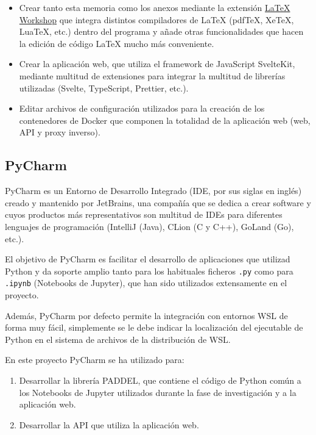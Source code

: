 \begin{itemize}
      \item Crear tanto esta memoria como los anexos mediante la extensión
            \href{https://github.com/James-Yu/LaTeX-Workshop}{\LaTeX{} Workshop}
            que integra distintos compiladores de \LaTeX{} (pdfTeX, XeTeX, LuaTeX,
            etc.) dentro del programa y añade otras funcionalidades que hacen la
            edición de código \LaTeX{} mucho más conveniente.
      \item Crear la aplicación web, que utiliza el framework de JavaScript
            SvelteKit, mediante multitud de extensiones para integrar la multitud
            de librerías utilizadas (Svelte, TypeScript, Prettier, etc.).
      \item Editar archivos de configuración utilizados para la creación de los
            contenedores de Docker que componen la totalidad de la aplicación web
            (web, API y proxy inverso).
\end{itemize}


\subsection{PyCharm}

PyCharm es un Entorno de Desarrollo Integrado (IDE, por sus siglas en inglés)
creado y mantenido por JetBrains, una compañía que se dedica a crear software y
cuyos productos más representativos son multitud de IDEs para diferentes
lenguajes de programación (IntelliJ (Java), CLion (C y C++), GoLand (Go), etc.).

El objetivo de PyCharm es facilitar el desarrollo de aplicaciones que utilizad
Python y da soporte amplio tanto para los habituales ficheros \texttt{.py} como
para \texttt{.ipynb} (Notebooks de Jupyter), que han sido utilizados
extensamente en el proyecto.

Además, PyCharm por defecto permite la integración con entornos WSL de forma muy
fácil, simplemente se le debe indicar la localización del ejecutable de Python
en el sistema de archivos de la distribución de WSL.

En este proyecto PyCharm se ha utilizado para:

\begin{enumerate}
      \item Desarrollar la librería PADDEL, que contiene el código de Python común
            a los Notebooks de Jupyter utilizados durante la fase de investigación
            y a la aplicación web.
      \item Desarrollar la API que utiliza la aplicación web.
\end{enumerate}


